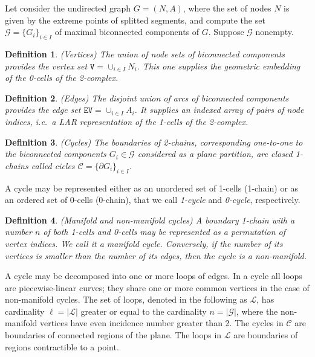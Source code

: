 \documentclass[11pt,oneside]{article}    %
\newtheorem{definition}{Definition}
\begin{document}
Let consider the undirected graph $G=(N,A)$, where the set of nodes $N$ is given by the extreme points of splitted  segments, and compute the set  $\mathcal{G} = \{G_i\}_{i\in I}$ of maximal biconnected components of $G$.    Suppose $\mathcal{G}$ nonempty.

\begin{definition}{(Vertices)}
The union of node sets of biconnected components provides the \emph{vertex} set $\texttt{V} = \cup_{i\in I} N_i$.
This one supplies the geometric embedding of the 0-cells of the 2-complex.
\end{definition}

\begin{definition}{(Edges)}
The disjoint union of arcs of biconnected components provides the \emph{edge set} $\texttt{EV} = \cup_{i\in I} A_i$.
It supplies an indexed array of pairs of node indices, i.e.~a LAR representation of the 1-cells of the 2-complex.
\end{definition}


\begin{definition}{(Cycles)}
The \emph{boundaries} of 2-chains, corresponding one-to-one to the biconnected components $G_i \in \mathcal{G}$ considered as a plane partition, are \emph{closed} 1-chains called \emph{cicles} $\mathcal{C} = \{\partial G_i\}_{i\in I}$.
\end{definition}

A cycle may be represented either as an unordered set of 1-cells (1-chain) or as an ordered set of 0-cells (0-chain), that we call \emph{1-cycle} and \emph{0-cycle}, respectively.

\begin{definition}{(Manifold and non-manifold cycles)}
A boundary 1-chain with a number $n$ of both 1-cells and 0-cells may be represented as a permutation of vertex indices. We call it a \emph{manifold cycle}.  Conversely, if the number of its vertices is smaller than the number of its edges, then the cycle is a \emph{non-manifold}.
\end{definition}

A cycle may be decomposed into one or more loops of edges. In a cycle all loops are piecewise-linear curves; they share one or more common vertices in the case of non-manifold cycles. The set of loops, denoted in the following as $\mathcal{L}$, has cardinality $\ell = |\mathcal{L}|$ greater or equal to the cardinality $n = |\mathcal{G}|$, where the non-manifold vertices have even incidence number greater than 2.
The cycles in $\mathcal{C}$ are boundaries of connected regions of the plane. The loops in $\mathcal{L}$ are boundaries of regions contractible to a point. 
\end{document}
